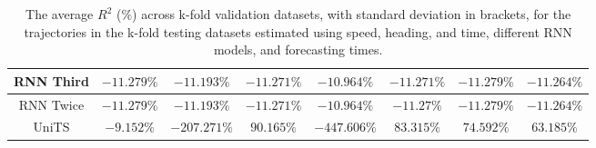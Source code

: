 \begin{table}[!ht]
{\begin{tabular}{|c|c|c|c|c|c|c|c|}
			RNN Third & $-11.279\%$ & $-11.193\%$ & $-11.271\%$ & $-10.964\%$ & $-11.271\%$ & $-11.279\%$ & $-11.264\%$ \\ \hline
			RNN Twice & $-11.279\%$ & $-11.193\%$ & $-11.271\%$ & $-10.964\%$ & $-11.27\%$ & $-11.279\%$ & $-11.264\%$ \\ \hline
			UniTS & $-9.152\%$ & $-207.271\%$ & $90.165\%$ & $-447.606\%$ & $83.315\%$ & $74.592\%$ & $63.185\%$ \\ \hline
		\end{tabular}
	}
	\caption{The average $R^{2}$ (\%) across k-fold validation datasets, with standard deviation in brackets, for the trajectories in the k-fold testing datasets estimated using speed, heading, and time, different RNN models, and forecasting times.}
	\label{tab:all_speed_actual_dir_R2}
\end{table}